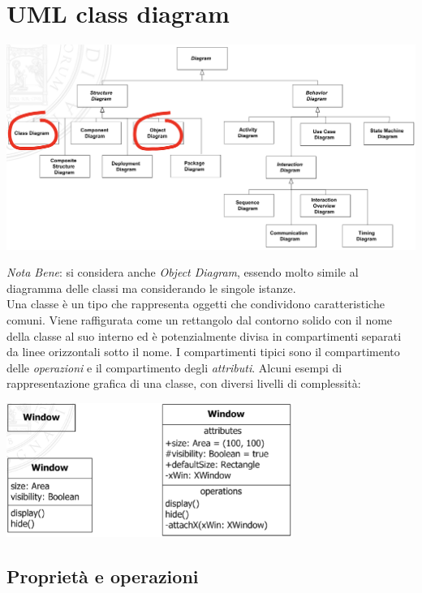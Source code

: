 \documentclass{article}
\begin{document}
\pagestyle{empty}

\section*{UML class diagram}
\large
\begin{center}
    \includegraphics[width=1\textwidth]{foto 1.png}
\end{center}
\textit{Nota Bene}: si considera anche \textit{Object Diagram}, essendo molto simile al diagramma delle classi ma considerando le singole istanze. \vspace{14pt}\\
Una classe è un tipo che rappresenta oggetti che condividono caratteristiche comuni.
Viene raffigurata come un rettangolo dal contorno solido con il nome della classe al suo interno ed è potenzialmente divisa in compartimenti separati da linee orizzontali sotto il nome.
I compartimenti tipici sono il compartimento delle \textit{operazioni} e il compartimento degli \textit{attributi}.
Alcuni esempi di rappresentazione grafica di una classe, con diversi livelli di complessità:
\begin{center}
    \includegraphics[width=0.7\textwidth]{foto 2.png}
\end{center}

\subsection*{Proprietà e operazioni}
\large
\end{document}
